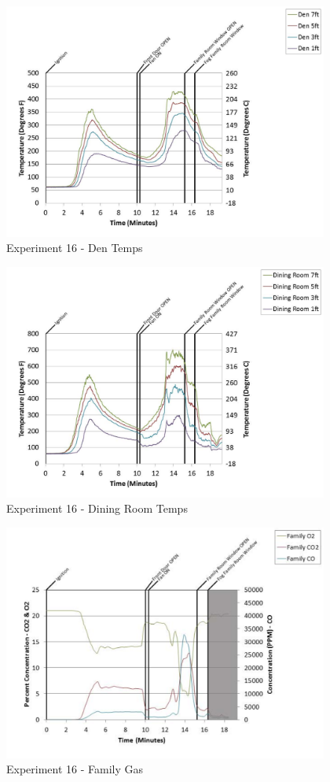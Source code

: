 \documentclass{article}
\begin{document}
\begin{appendices}
	\begin{figure}[h!]
		\centering
		\includegraphics[height=3.05in]{0_Images/Results_Charts/Exp_16_Charts/DenTemps.pdf}
		\caption{Experiment 16 - Den Temps}
	\end{figure}
 
	\clearpage

	\begin{figure}[h!]
		\centering
		\includegraphics[height=3.05in]{0_Images/Results_Charts/Exp_16_Charts/DiningRoomTemps.pdf}
		\caption{Experiment 16 - Dining Room Temps}
	\end{figure}
 

	\begin{figure}[h!]
		\centering
		\includegraphics[height=3.05in]{0_Images/Results_Charts/Exp_16_Charts/FamilyGas.pdf}
		\caption{Experiment 16 - Family Gas}
	\end{figure}
 

\end{appendices}
\end{document}
